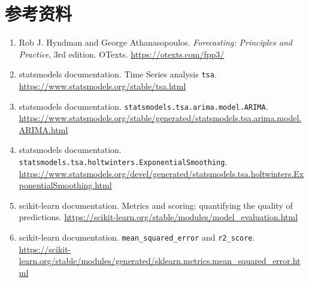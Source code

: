 \documentclass[11pt,a4paper]{ctexart}
\begin{document}
\newpage
\section*{参考资料}
\begin{enumerate}
  \item Rob J. Hyndman and George Athanasopoulos. \emph{Forecasting: Principles and Practice}, 3rd edition. OTexts. \url{https://otexts.com/fpp3/}
  \item statsmodels documentation. Time Series analysis \texttt{tsa}. \url{https://www.statsmodels.org/stable/tsa.html}
  \item statsmodels documentation. \texttt{statsmodels.tsa.arima.model.ARIMA}. \url{https://www.statsmodels.org/stable/generated/statsmodels.tsa.arima.model.ARIMA.html}
  \item statsmodels documentation. \texttt{statsmodels.tsa.holtwinters.ExponentialSmoothing}. \url{https://www.statsmodels.org/devel/generated/statsmodels.tsa.holtwinters.ExponentialSmoothing.html}
  \item scikit-learn documentation. Metrics and scoring: quantifying the quality of predictions. \url{https://scikit-learn.org/stable/modules/model_evaluation.html}
  \item scikit-learn documentation. \texttt{mean\_squared\_error} and \texttt{r2\_score}. \url{https://scikit-learn.org/stable/modules/generated/sklearn.metrics.mean_squared_error.html}
\end{enumerate}
\end{document}

